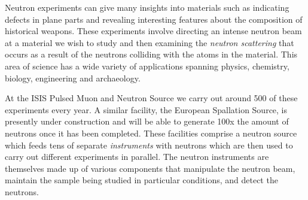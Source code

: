 Neutron experiments can give many insights into materials such as indicating defects in plane parts and revealing interesting features about the composition of historical weapons. These experiments involve directing an intense neutron beam at a material we wish to study and then examining the \textit{neutron scattering} that occurs as a result of the neutrons colliding with the atoms in the material. This area of science has a wide variety of applications spanning physics, chemistry, biology, engineering and archaeology.

At the ISIS Pulsed Muon and Neutron Source we carry out around 500 of these experiments every year. A similar facility, the European Spallation Source, is presently under construction and will be able to generate \texttildelow 100x the amount of neutrons once it has been completed. These facilities comprise a neutron source which feeds tens of separate \textit{instruments} with neutrons which are then used to carry out different experiments in parallel. The neutron instruments are themselves made up of various components that manipulate the neutron beam, maintain the sample being studied in particular conditions, and detect the neutrons.
